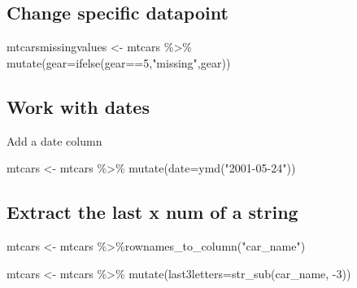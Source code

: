 \documentclass[
]{article}
\newenvironment{Shaded}{\begin{snugshade}}{\end{snugshade}}
\newcommand{\AttributeTok}[1]{\textcolor[rgb]{0.77,0.63,0.00}{#1}}
\newcommand{\DecValTok}[1]{\textcolor[rgb]{0.00,0.00,0.81}{#1}}
\newcommand{\FunctionTok}[1]{\textcolor[rgb]{0.00,0.00,0.00}{#1}}
\newcommand{\NormalTok}[1]{#1}
\newcommand{\OtherTok}[1]{\textcolor[rgb]{0.56,0.35,0.01}{#1}}
\newcommand{\SpecialCharTok}[1]{\textcolor[rgb]{0.00,0.00,0.00}{#1}}
\newcommand{\StringTok}[1]{\textcolor[rgb]{0.31,0.60,0.02}{#1}}
\begin{document}
\hypertarget{change-specific-datapoint}{%
\subsection{Change specific datapoint}\label{change-specific-datapoint}}

\begin{Shaded}
\begin{Highlighting}[]
\NormalTok{mtcarsmissingvalues }\OtherTok{\textless{}{-}}\NormalTok{ mtcars }\SpecialCharTok{\%\textgreater{}\%} \FunctionTok{mutate}\NormalTok{(}\AttributeTok{gear=}\FunctionTok{ifelse}\NormalTok{(gear}\SpecialCharTok{==}\DecValTok{5}\NormalTok{,}\StringTok{"missing"}\NormalTok{,gear))}
\end{Highlighting}
\end{Shaded}

\hypertarget{work-with-dates}{%
\subsection{Work with dates}\label{work-with-dates}}

Add a date column

\begin{Shaded}
\begin{Highlighting}[]
\NormalTok{mtcars }\OtherTok{\textless{}{-}}\NormalTok{ mtcars }\SpecialCharTok{\%\textgreater{}\%} \FunctionTok{mutate}\NormalTok{(}\AttributeTok{date=}\FunctionTok{ymd}\NormalTok{(}\StringTok{"2001{-}05{-}24"}\NormalTok{))}
\end{Highlighting}
\end{Shaded}

\hypertarget{extract-the-last-x-num-of-a-string}{%
\subsection{Extract the last x num of a string}\label{extract-the-last-x-num-of-a-string}}

\begin{Shaded}
\begin{Highlighting}[]
\NormalTok{mtcars }\OtherTok{\textless{}{-}}\NormalTok{ mtcars }\SpecialCharTok{\%\textgreater{}\%}\FunctionTok{rownames\_to\_column}\NormalTok{(}\StringTok{"car\_name"}\NormalTok{)}

\NormalTok{mtcars }\OtherTok{\textless{}{-}}\NormalTok{ mtcars }\SpecialCharTok{\%\textgreater{}\%} \FunctionTok{mutate}\NormalTok{(}\AttributeTok{last3letters=}\FunctionTok{str\_sub}\NormalTok{(car\_name, }\SpecialCharTok{{-}}\DecValTok{3}\NormalTok{))}
\end{Highlighting}
\end{Shaded}
\end{document}
